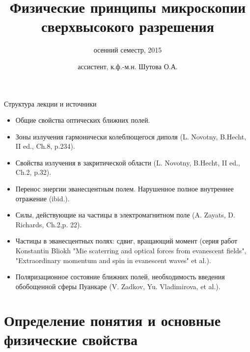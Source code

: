 \documentclass[9pt, compress, xcolor=table]{beamer}
\title{Физические принципы микроскопии сверхвысокого разрешения}
\subtitle{осенний семестр, 2015}
\author{ассистент, к.ф.-м.н. Шутова О.А.}
\institute{МГУ им. М.В. Ломоносова, физический факультет}
\begin{document}
\maketitle


\begin{frame}{Структура лекции и источники}
    
    \begin{itemize}
    \item Общие свойства оптических ближних полей.
    
    \item Зоны излучения гармонически колеблющегося диполя (L. Novotny, B.Hecht, II ed., Ch.8, p.234).
    
    \item Свойства излучения в закритической области (L. Novotny, B.Hecht, II ed., Ch.2, p.32).
    
    \item Перенос энергии эванесцентным полем. Нарушенное полное внутреннее отражение (ibid.).
    
    \item Силы, действующие на частицы в электромагнитном поле (A. Zayats, D. Richards, Ch.2,p. 22). 
    \item Частицы в эванесцентных полях: сдвиг, вращающий момент (серия работ Konstantin Bliokh "Mie scaterring and optical forces from evanescent fields", "Extraordinary momentum and spin in evanescent waves" et al.).
    \item Поляризационное состояние ближних полей, необходимость введения обобощенной сферы Пуанкаре (V. Zadkov, Yu. Vladimirova, et al.).
    
    \end{itemize}
    
\end{frame}

\section{Определение понятия и основные физические свойства}
\end{document}
